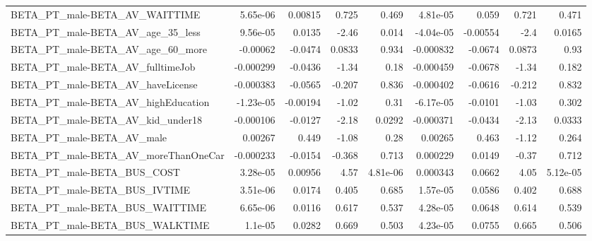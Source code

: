 \begin{tabular}{lrrrrrrrr}
BETA\_PT\_male-BETA\_AV\_WAITTIME                      &    5.65e-06 &      0.00815 &    0.725 &    0.469 &   4.81e-05 &       0.059 &        0.721 &         0.471 \\
BETA\_PT\_male-BETA\_AV\_age\_35\_less                   &    9.56e-05 &       0.0135 &    -2.46 &    0.014 &  -4.04e-05 &    -0.00554 &         -2.4 &        0.0165 \\
BETA\_PT\_male-BETA\_AV\_age\_60\_more                   &    -0.00062 &      -0.0474 &   0.0833 &    0.934 &  -0.000832 &     -0.0674 &       0.0873 &          0.93 \\
BETA\_PT\_male-BETA\_AV\_fulltimeJob                   &   -0.000299 &      -0.0436 &    -1.34 &     0.18 &  -0.000459 &     -0.0678 &        -1.34 &         0.182 \\
BETA\_PT\_male-BETA\_AV\_haveLicense                   &   -0.000383 &      -0.0565 &   -0.207 &    0.836 &  -0.000402 &     -0.0616 &       -0.212 &         0.832 \\
BETA\_PT\_male-BETA\_AV\_highEducation                 &   -1.23e-05 &     -0.00194 &    -1.02 &     0.31 &  -6.17e-05 &     -0.0101 &        -1.03 &         0.302 \\
BETA\_PT\_male-BETA\_AV\_kid\_under18                   &   -0.000106 &      -0.0127 &    -2.18 &   0.0292 &  -0.000371 &     -0.0434 &        -2.13 &        0.0333 \\
BETA\_PT\_male-BETA\_AV\_male                          &     0.00267 &        0.449 &    -1.08 &     0.28 &    0.00265 &       0.463 &        -1.12 &         0.264 \\
BETA\_PT\_male-BETA\_AV\_moreThanOneCar                &   -0.000233 &      -0.0154 &   -0.368 &    0.713 &   0.000229 &      0.0149 &        -0.37 &         0.712 \\
BETA\_PT\_male-BETA\_BUS\_COST                         &    3.28e-05 &      0.00956 &     4.57 & 4.81e-06 &   0.000343 &      0.0662 &         4.05 &      5.12e-05 \\
BETA\_PT\_male-BETA\_BUS\_IVTIME                       &    3.51e-06 &       0.0174 &    0.405 &    0.685 &   1.57e-05 &      0.0586 &        0.402 &         0.688 \\
BETA\_PT\_male-BETA\_BUS\_WAITTIME                     &    6.65e-06 &       0.0116 &    0.617 &    0.537 &   4.28e-05 &      0.0648 &        0.614 &         0.539 \\
BETA\_PT\_male-BETA\_BUS\_WALKTIME                     &     1.1e-05 &       0.0282 &    0.669 &    0.503 &   4.23e-05 &      0.0755 &        0.665 &         0.506 \\

\end{tabular}
